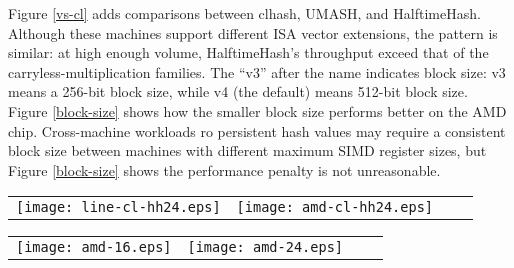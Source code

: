 \documentclass[sigconf, nonacm]{acmart}
\begin{document}
Figure \ref{vs-cl} adds comparisons between clhash, UMASH, and HalftimeHash.
Although these machines support different ISA vector extensions, the pattern is similar: at high enough volume, HalftimeHash's throughput exceed that of the carryless-multiplication families.
The ``v3'' after the name indicates block size: v3 means a 256-bit block size, while v4 (the default) means 512-bit block size.
Figure \ref{block-size} shows how the smaller block size performs better on the AMD chip.
Cross-machine workloads ro persistent hash values may require a consistent block size between machines with different maximum SIMD register sizes, but Figure \ref{block-size} shows the performance penalty is not unreasonable.

\begin{figure*}
\begin{tabular}{cccc}
\texttt{[image: line-cl-hh24.eps]}
&
\texttt{[image: amd-cl-hh24.eps]}
\end{tabular}
\caption{
  \label{vs-cl}
  Comparison of Intel (i7-7800x) and AMD (EC2 c5a.large, 7R32 chip) performance.
  These AMD chips do not support AVX-512, but still HalftimeHash with 256-bit registers exceeds the speed of clmul-based hashing methods by up to a factor of 2 on long strings.
  In both cases, for long strings, HalftimeHash with 24 bytes of output is faster than clhash and UMASH.
  HalftimeHash24 also has lower collision probability.
  For long strings, the incremental cost of hashing the 24 bytes down to 8 with tabulation hashing is insignificant.
}
\end{figure*}

\begin{table*}
\begin{tabular}{cccc}
\texttt{[image: amd-16.eps]}
&
\texttt{[image: amd-24.eps]}
\end{tabular}
\caption{
  \label{block-size}
  AMD performance.
  AMD chips do not have AVX-512 instructions, so blocks of that size are simulated with 2 AVX2 registers.
  Using a block size of 256 bits performs better.}
\end{table*}


\end{document}
